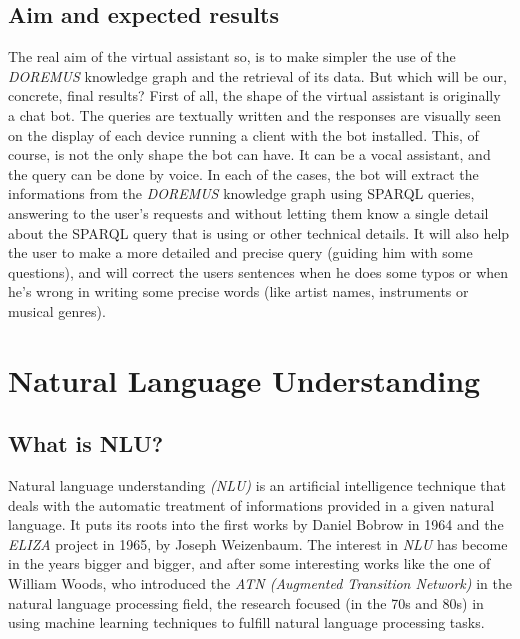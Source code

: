 \documentclass[a4paper,12pt]{report}
\begin{document}
	\section{Aim and expected results}
	The real aim of the virtual assistant so, is to make simpler the use of the \textit{DOREMUS} knowledge graph and the retrieval of its data. But which will be our, concrete, final results? First of all, the shape of the virtual assistant is originally a chat bot. The queries are textually written and the responses are visually seen on the display of each device running a client with the bot installed. This, of course, is not the only shape the bot can have. It can be a vocal assistant, and the query can be done by voice. In each of the cases, the bot will extract the informations from the \textit{DOREMUS} knowledge graph using SPARQL queries, answering to the user's requests and without letting them know a single detail about the SPARQL query that is using or other technical details. It will also help the user to make a more detailed and precise query (guiding him with some questions), and will correct the users sentences when he does some typos or when he's wrong in writing some precise words (like artist names, instruments or musical genres).

\chapter{Natural Language Understanding}
	\section{What is NLU?}
	Natural language understanding \textit{(NLU)} is an artificial intelligence technique that deals with the automatic treatment of informations provided in a given natural language. It puts its roots into the first works by Daniel Bobrow\cite{bobrow} in 1964 and the \textit{ELIZA}\cite{eliza} project in 1965, by Joseph Weizenbaum. The interest in \textit{NLU} has become in the years bigger and bigger, and after some interesting works like the one of William Woods\cite{woods}, who introduced the \textit{ATN (Augmented Transition Network)} in the natural language processing field, the research focused (in the 70s and 80s) in using machine learning techniques to fulfill natural language processing tasks.
\end{document}
